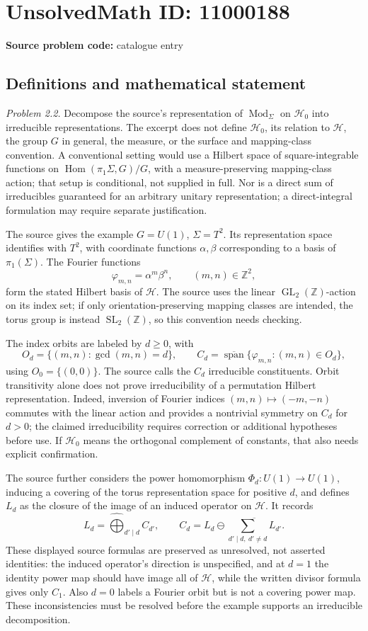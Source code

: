 \documentclass[11pt]{article}
\newcommand{\Z}{\mathbb{Z}}
\begin{document}
\section*{UnsolvedMath ID: 11000188}
\textbf{Source problem code:} catalogue entry
\subsection{Definitions and mathematical statement}
\emph{Problem 2.2.} Decompose the source's representation of \(\operatorname{Mod}_\Sigma\) on \(\mathcal H_0\) into irreducible representations. The excerpt does not define \(\mathcal H_0\), its relation to \(\mathcal H\), the group \(G\) in general, the measure, or the surface and mapping-class convention. A conventional setting would use a Hilbert space of square-integrable functions on \(\operatorname{Hom}(\pi_1\Sigma,G)/G\), with a measure-preserving mapping-class action; that setup is conditional, not supplied in full. Nor is a direct sum of irreducibles guaranteed for an arbitrary unitary representation; a direct-integral formulation may require separate justification.

The source gives the example \(G=U(1)\), \(\Sigma=T^2\). Its representation space identifies with \(T^2\), with coordinate functions \(\alpha,\beta\) corresponding to a basis of \(\pi_1(\Sigma)\). The Fourier functions
\[
 \varphi_{m,n}=\alpha^m\beta^n,\qquad(m,n)\in\Z^2,
\]
form the stated Hilbert basis of \(\mathcal H\). The source uses the linear \(\operatorname{GL}_2(\Z)\)-action on its index set; if only orientation-preserving mapping classes are intended, the torus group is instead \(\operatorname{SL}_2(\Z)\), so this convention needs checking.

The index orbits are labeled by \(d\geq0\), with
\[
 O_d=\{(m,n):\gcd(m,n)=d\},\qquad
 C_d=\overline{\operatorname{span}}\{\varphi_{m,n}:(m,n)\in O_d\},
\]
using \(O_0=\{(0,0)\}\). The source calls the \(C_d\) irreducible constituents. Orbit transitivity alone does not prove irreducibility of a permutation Hilbert representation. Indeed, inversion of Fourier indices \((m,n)\mapsto(-m,-n)\) commutes with the linear action and provides a nontrivial symmetry on \(C_d\) for \(d>0\); the claimed irreducibility requires correction or additional hypotheses before use. If \(\mathcal H_0\) means the orthogonal complement of constants, that also needs explicit confirmation.

The source further considers the power homomorphism \(\Phi_d:U(1)\to U(1)\), inducing a covering of the torus representation space for positive \(d\), and defines \(L_d\) as the closure of the image of an induced operator on \(\mathcal H\). It records
\[
 L_d=\widehat{\bigoplus}_{d'\mid d}C_{d'},\qquad
 C_d=L_d\ominus\overline{\sum_{d'\mid d,\ d'\neq d}L_{d'}}.
\]
These displayed source formulas are preserved as unresolved, not asserted identities: the induced operator's direction is unspecified, and at \(d=1\) the identity power map should have image all of \(\mathcal H\), while the written divisor formula gives only \(C_1\). Also \(d=0\) labels a Fourier orbit but is not a covering power map. These inconsistencies must be resolved before the example supports an irreducible decomposition.
\end{document}
